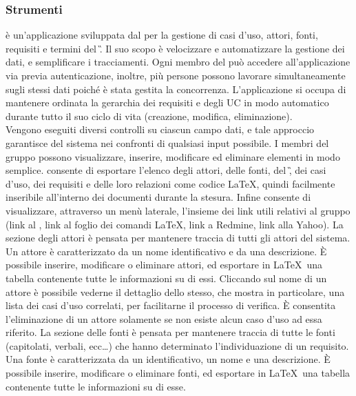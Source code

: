 \subsubsection{Strumenti}
\subsubsubsection{\pragmadb}\label{PragmaDB}
\pragmadb è un'applicazione  sviluppata dal  per la gestione di casi d'uso, attori, fonti, requisiti e termini del \G. Il suo scopo è velocizzare e automatizzare la gestione dei dati, e semplificare i tracciamenti. Ogni membro del  può accedere all'applicazione via  previa autenticazione, inoltre, più persone possono lavorare simultaneamente sugli stessi dati poiché è stata gestita la concorrenza. L'applicazione si occupa di mantenere ordinata la gerarchia dei requisiti e degli UC in modo automatico durante tutto il suo ciclo di vita (creazione, modifica, eliminazione).\\
Vengono eseguiti diversi controlli su ciascun campo dati, e tale approccio garantisce  del sistema nei confronti di qualsiasi input possibile. I membri del gruppo possono visualizzare, inserire, modificare ed eliminare elementi in modo semplice. \pragmadb consente di esportare l'elenco degli attori, delle fonti, del \G, dei casi d'uso, dei requisiti e delle loro relazioni come codice \LaTeX, quindi facilmente inseribile all'interno dei documenti durante la stesura. Infine consente di visualizzare, attraverso un menù laterale, l'insieme dei link utili relativi al gruppo (link al , link al foglio dei comandi \LaTeX, link a Redmine, link alla  Yahoo).
La sezione degli attori è pensata per mantenere traccia di tutti gli attori del sistema.
Un attore è caratterizzato da un nome identificativo e da una descrizione. \`{E} possibile inserire, modificare o eliminare attori, ed esportare in \LaTeX\ una tabella contenente tutte le informazioni su di essi.
Cliccando sul nome di un attore è possibile vederne il dettaglio dello stesso, che mostra in particolare, una lista dei casi d'uso correlati, per facilitarne il processo di verifica.
\`E consentita l'eliminazione di un attore solamente se non esiste alcun caso d'uso ad essa riferito.
La sezione delle fonti è pensata per mantenere traccia di tutte le fonti (capitolati, verbali, ecc\dots) che hanno determinato l'individuazione di un requisito.
Una fonte è caratterizzata da un identificativo, un nome e una descrizione. \`{E} possibile inserire, modificare o eliminare fonti, ed esportare in \LaTeX\ una tabella contenente tutte le informazioni su di esse.
